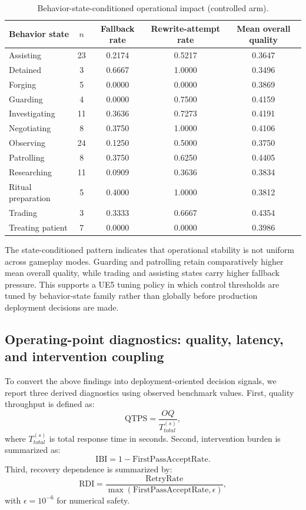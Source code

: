 ﻿\documentclass[a4paper,12pt]{article}
\begin{document}
\begin{table}[t]
\centering
\caption{Behavior-state-conditioned operational impact (controlled arm).}
\label{tab:ue5_state_operational}
\begingroup
\footnotesize
\setlength{\tabcolsep}{4pt}
\begin{tabular}{lcccc}
\toprule
Behavior state & \(n\) & Fallback rate & Rewrite-attempt rate & Mean overall quality \\
\midrule
Assisting & 23 & 0.2174 & 0.5217 & 0.3647 \\
Detained & 3 & 0.6667 & 1.0000 & 0.3496 \\
Forging & 5 & 0.0000 & 0.0000 & 0.3869 \\
Guarding & 4 & 0.0000 & 0.7500 & 0.4159 \\
Investigating & 11 & 0.3636 & 0.7273 & 0.4191 \\
Negotiating & 8 & 0.3750 & 1.0000 & 0.4106 \\
Observing & 24 & 0.1250 & 0.5000 & 0.3750 \\
Patrolling & 8 & 0.3750 & 0.6250 & 0.4405 \\
Researching & 11 & 0.0909 & 0.3636 & 0.3834 \\
Ritual preparation & 5 & 0.4000 & 1.0000 & 0.3812 \\
Trading & 3 & 0.3333 & 0.6667 & 0.4354 \\
Treating patient & 7 & 0.0000 & 0.0000 & 0.3986 \\
\bottomrule
\end{tabular}
\endgroup
\end{table}

The state-conditioned pattern indicates that operational stability is not uniform across gameplay modes. Guarding and patrolling retain comparatively higher mean overall quality, while trading and assisting states carry higher fallback pressure. This supports a UE5 tuning policy in which control thresholds are tuned by behavior-state family rather than globally before production deployment decisions are made.

\subsection{Operating-point diagnostics: quality, latency, and intervention coupling}
To convert the above findings into deployment-oriented decision signals, we report three derived diagnostics using observed benchmark values. First, quality throughput is defined as:
\begin{equation}
\mathrm{QTPS}=\frac{OQ}{T_{total}^{(s)}},
\end{equation}
where \(T_{total}^{(s)}\) is total response time in seconds. Second, intervention burden is summarized as:
\begin{equation}
\mathrm{IBI}=1-\mathrm{FirstPassAcceptRate}.
\end{equation}
Third, recovery dependence is summarized by:
\begin{equation}
\mathrm{RDI}=\frac{\mathrm{RetryRate}}{\max(\mathrm{FirstPassAcceptRate},\epsilon)},
\end{equation}
with \(\epsilon=10^{-6}\) for numerical safety.
\end{document}
